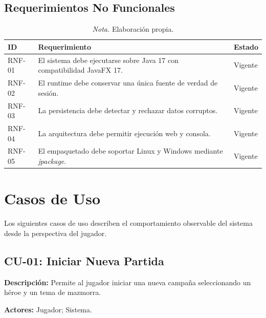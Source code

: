 \documentclass[stu,12pt,floatsintext]{apa7}
\begin{document}

\subsection{Requerimientos No Funcionales}

\begin{table}[H]
\centering
\caption{Requerimientos no funcionales del sistema}
\begin{tabular}{p{2cm}p{9cm}p{3cm}}
\toprule
\textbf{ID} & \textbf{Requerimiento} & \textbf{Estado} \\
\midrule
RNF-01 & El sistema debe ejecutarse sobre Java 17 con compatibilidad JavaFX 17. & Vigente \\

RNF-02 & El runtime debe conservar una única fuente de verdad de sesión. & Vigente \\

RNF-03 & La persistencia debe detectar y rechazar datos corruptos. & Vigente \\

RNF-04 & La arquitectura debe permitir ejecución web y consola. & Vigente \\

RNF-05 & El empaquetado debe soportar Linux y Windows mediante \textit{jpackage}. & Vigente \\
\bottomrule
\end{tabular}
\caption*{\textit{Nota.} Elaboración propia.}
\end{table}


\section{Casos de Uso}

Los siguientes casos de uso describen el comportamiento observable del sistema desde la perspectiva del jugador.

\subsection{CU-01: Iniciar Nueva Partida}

\textbf{Descripción:} Permite al jugador iniciar una nueva campaña seleccionando un héroe y un tema de mazmorra.

\textbf{Actores:} Jugador; Sistema.
\end{document}
